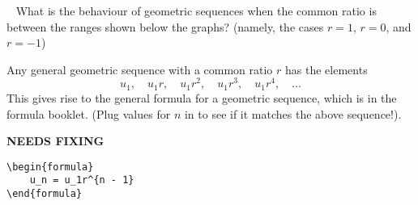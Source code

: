 \documentclass[../../main.tex]{subfiles}
\begin{document}
\begin{figure}[h]
    \centering
    \begin{subfigure}{0.49\textwidth}
    \end{subfigure}
    \begin{subfigure}{0.49\textwidth}
    \end{subfigure}
\end{figure}

\begin{thinking}{~}
    What is the behaviour of geometric sequences when the common ratio is between the ranges shown below the graphs? (namely, the cases \(r = 1\), \(r = 0\), and \(r = -1\))
\end{thinking}

Any general geometric sequence with a common ratio \(r\) has the elements
\[
    u_1,\quad u_1r,\quad u_1r^2,\quad u_1r^3,\quad u_1r^4,\quad \ldots
\]
This gives rise to the general formula for a geometric sequence, which is in the formula booklet. (Plug values for \(n\) in to see if it matches the above sequence!).

{\hfill\Large\bfseries NEEDS FIXING\hfill}
\begin{lstlisting}
\begin{formula}
    u_n = u_1r^{n - 1}
\end{formula}
 \end{lstlisting}
\end{document}
